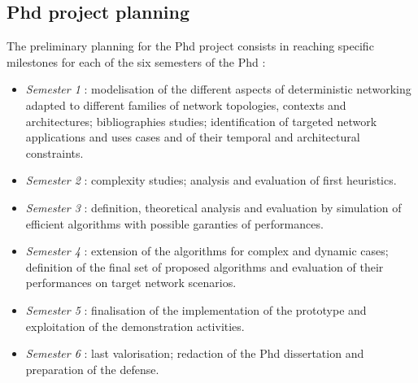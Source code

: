 \documentclass{article}
\begin{document}
 \subsection*{Phd project planning}
 The preliminary  planning for the Phd project consists in reaching specific milestones for each of the six semesters of the Phd :
 \begin{itemize}
 \item {\it Semester 1 }: modelisation of the different aspects of deterministic networking  adapted to different families of network topologies, contexts and architectures; bibliographies studies; identification of targeted network applications and uses cases and of their temporal and architectural constraints.
 \item {\it Semester 2 }: complexity studies; analysis and evaluation of first heuristics.
 \item {\it Semester 3 }: definition, theoretical analysis and evaluation by simulation of efficient algorithms with possible garanties of performances.
 \item {\it Semester 4 }: extension of the algorithms for complex and dynamic cases; definition of the final set of proposed algorithms and evaluation of their performances on target network scenarios.
 \item {\it Semester 5 }: finalisation of the implementation of the prototype and exploitation of the demonstration activities.
 \item {\it Semester 6 }: last valorisation; redaction of the  Phd dissertation and preparation of the defense.
  \end{itemize}


\end{document}
